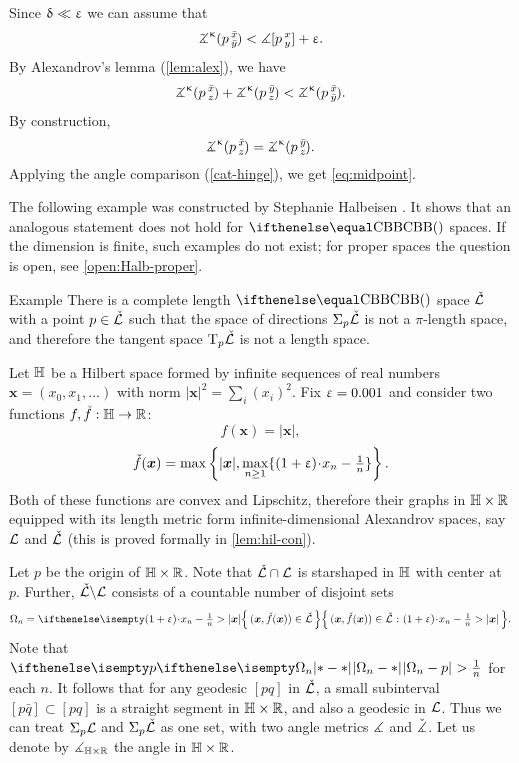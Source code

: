 Since $\updelta\ll \upvarepsilon$  we can assume that 
\[\angk\kappa p{\bar x}{\bar y}<\mangle \hinge pxy+\eps.\]
By  Alexandrov's lemma (\ref{lem:alex}), we have
\[\angk\kappa p{\bar x}{z}+\angk\kappa p{\bar y}{z}< \angk\kappa p{\bar x}{\bar y}.\]
By construction,
\[\angk\kappa p{\bar x}{z}=\angk\kappa p{\bar y}{z}.\]
Applying the angle comparison (\ref{cat-hinge}), we get \ref{eq:midpoint}.
\qeds

The following example was constructed by Stephanie Halbeisen \cite{halbeisen}.
It shows that an analogous statement does not hold for $\Alex{}$ spaces.
If the dimension is finite, such examples do not exist; %
for proper spaces the question is open, see \ref{open:Halb-proper}.

\begin{thm}{Example}\label{Halbeisen's example}
There is a complete length $\Alex{}$ space $\check{\mathcal{L}}$
with a point $p\in\check{\spc{L}}$ such that the space of directions $\Sigma_p\check{\mathcal{L}}$ is not a $\pi$-length space, and therefore the tangent space $\text{\rm T}_p\check{\mathcal{L}}$ is not a length space. 
\end{thm}



Let $\mathbb{H}$ be a Hilbert space formed by infinite sequences of real numbers $\bm{x}=(x_0,x_1,\dots)$ with norm
$|\bm{x}|^2=\sum_i(x_i)^2$. 
Fix $\upvarepsilon=0.001$ and consider two functions $f,\check f:\HH\to\RR$:
\[f(\bm{x})=|\bm{x}|,\]
\[\check f(\bm{x})
=
\max\left\{|\bm{x}|,\max_{n\ge1}\{(1+\eps)\cdot x_n-\tfrac{1}{n}\}\right\}.\] 
Both of these functions are convex and Lipschitz, therefore their graphs in $\HH\times \RR$ equipped with its length metric form infinite-dimensional Alexandrov spaces, say $\mathcal{L}$  and $\check{\mathcal{L}}$ (this is proved formally in \ref{lem:hil-con}).

Let $p$ be the origin of $\HH\times \RR$.
Note that $\check{\spc{L}}\cap\spc{L}$ is starshaped in $\mathbb{H}$ with center at $p$.
Further, $\check{\mathcal{L}}\backslash\mathcal{L}$ consists of a countable number of disjoint sets
\[\Omega_n=\set{(\bm{x},\check f(\bm{x}))\in\check{\spc{L}}}{(1+\eps)\cdot x_n-\tfrac{1}{n}>|\bm{x}|}.\]
Note that $\dist{\Omega_n}{p}{}>\tfrac{1}{n}$ for each $n$.
It follows that for any geodesic $[p q]$ in $\check{\mathcal{L}}$,
a small subinterval $[p \bar q]\subset [p q]$ 
is a straight segment in $\HH\times\RR$, 
and also a geodesic in $\mathcal{L}$.
Thus we can treat $\Sigma_p\mathcal{L}$ and $\Sigma_p\check{\mathcal{L}}$ as one set, with two angle metrics $\measuredangle$ and $\check{\measuredangle}$.
Let us denote by $\mangle_{\HH\times \RR}$ the angle in $\HH\times\RR$.

